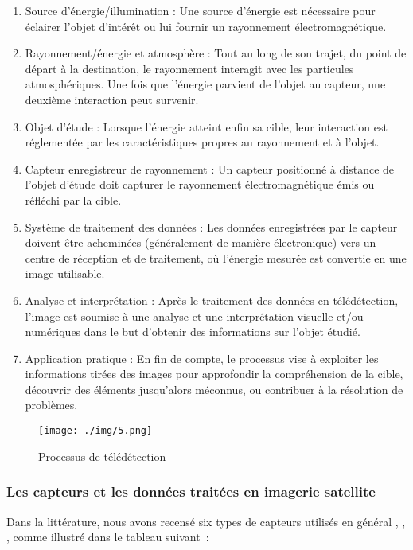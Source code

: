 \begin{enumerate}
	\item 	Source d'énergie/illumination : Une source d'énergie est nécessaire pour éclairer l'objet d'intérêt ou lui fournir un rayonnement électromagnétique.
	\item 	Rayonnement/énergie et atmosphère : Tout au long de son trajet, du point de départ à la destination, le rayonnement interagit avec les particules atmosphériques. Une fois que l'énergie parvient de l'objet au capteur, une deuxième interaction peut survenir.
	\item 	Objet d'étude : Lorsque l'énergie atteint enfin sa cible, leur interaction est réglementée par les caractéristiques propres au rayonnement et à l'objet.
	\item 	Capteur enregistreur de rayonnement : Un capteur positionné à distance de l'objet d'étude doit capturer le rayonnement électromagnétique émis ou réfléchi par la cible.
	\item 	Système de traitement des données : Les données enregistrées par le capteur doivent être acheminées (généralement de manière électronique) vers un centre de réception et de traitement, où l'énergie mesurée est convertie en une image utilisable.
	\item 	Analyse et interprétation : Après le traitement des données en télédétection, l'image est soumise à une analyse et une interprétation visuelle et/ou numériques dans le but d'obtenir des informations sur l'objet étudié.
	\item 	Application pratique : En fin de compte, le processus vise à exploiter les informations tirées des images pour approfondir la compréhension de la cible, découvrir des éléments jusqu'alors méconnus, ou contribuer à la résolution de problèmes.
	
\end{enumerate}

\begin{figure}[H]
	\centering
	\texttt{[image: ./img/5.png]}
	\caption{Processus de télédétection}
	\label{i5}
\end{figure}
\subsubsection{Les capteurs et les données traitées en imagerie satellite}
Dans la littérature, nous avons recensé six types de capteurs utilisés en général \cite{32} ,\cite{33} ,\cite{34} ,  comme illustré dans le tableau suivant :


